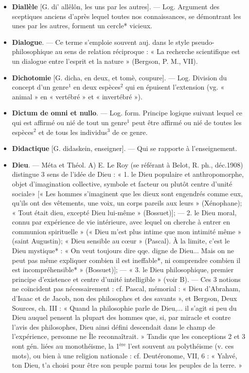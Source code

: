 \begin{itemize}[leftmargin=1cm, label=, itemsep=1pt]
\item {\bf Diallèle} [G. di’ allêlôn, les uns par les
autres]. — Log. Argument des
sceptiques anciens d’après lequel
toutes nos connaissances, se démontrant les unes par les autres, forment un cercle* vicieux.

\item {\bf Dialogue}. — Ce terme s'emploie souvent auj. dans le style pseudo-philosophique au sens de relation réciproque : « La recherche scientifique
est un dialogue entre l'esprit et la
nature » (Bergson, P. M., VII).

\item {\bf Dichotomie} [G. dicha, en deux, et
tomè, coupure]. — Log. Division
du concept d’un genre$^1$ en deux espèces$^2$ qui en épuisent l’extension
(vg. « animal » en « vertébré » et
« invertébré »).

\item {\bf Dictum de omni et nullo}. — Log.
form. Principe logique suivant lequel ce qui est affirmé ou nié de
tout un genre$^1$ peut être affirmé ou
nié de toutes les espèces$^2$ et de tous
les individus$^3$ de ce genre.

\item {\bf Didactique} [G. didaskein, enseigner].
— Qui se rapporte à l’enseignement.

\item {\bf Dieu}. — Méta et Théol. A) E. Le Roy
(se référant à Belot, R. ph., déc.1908)
distingue 3 sens de l'idée de Dieu :
« 1. le Dieu populaire et anthropomorphe, objet d'imagination collective, symbole et facteur ou plutôt
centre d'unité sociale» [« Les hommes
s'imaginent que les dieux sont engendrés comme eux, qu'ils ont des
vêtements, une voix, un corps
pareils aux leurs » (Xénophane);
« Tout était dieu, excepté Dieu lui-même » (Bossuet)]; — 2. le Dieu
moral, connu par expérience de vie
intérieure, avec lequel on cherche à
entrer en communion spirituelle »
(« Dieu m'est plus intime que mon
intimité même » (saint Augustin);
« Dieu sensible au cœur » (Pascal).
À la limite, c’est le Dieu mystique* :
« On veut toujours dire qqe. digne
de Dieu... Mais on ne peut pas même
expliquer combien il est ineffable*,
ni comprendre combien il est incompréhensible* » (Bossuet)]; —
« 3. le Dieu philosophique, premier
principe d’existence et centre d’unité
intelligible » (voir B). — Ces 3 notions ne coïncident pas nécessairement : cf. Pascal, mémorial : « Dieu
d'Abraham, d’Isaac et de Jacob,
non des philosophes et des savants »,
et Bergson, Deux Sources, ch. III :
« Quand la philosophie parle de
Dieu,... il s’agit si peu du Dieu
auquel pensent la plupart des
hommes que, si, par miracle et
contre l'avis des philosophes, Dieu
ainsi défini descendait dans le champ
de l'expérience, personne ne Île
reconnaîtrait. » Tandis que les conceptions 2 et 3 sont gén. liées au
monothéisme, la 1$^\text{ère}$ l’est souvent au
polythéisme (v. ces mots), ou bien à
une religion nationale : cf. Deutéronome, VII, 6 : « Yahvé, ton Dieu,
t'a choisi pour être son peuple parmi
tous les peuples de la terre. »


\end{itemize}
